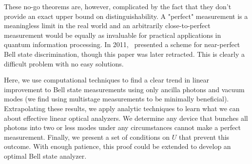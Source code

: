 \documentclass[aps,pra,twocolumn,showpacs,superscriptaddress,floatfix,10pt]{revtex4}
\begin{document}
These no-go theorems are, however, complicated by the fact that they don't provide an exact upper bound on distinguishability. A "perfect" measurement is a meaningless limit in the real world and an arbitrarily close-to-perfect measurement would be  equally as invaluable for practical applications in quantum information processing. In 2011,~\cite{Pavicic} presented a scheme for near-perfect Bell state discrimination, though this paper was later retracted. This is clearly a difficult problem with no easy solutions.

Here, we use computational techniques to find a clear trend in linear improvement to Bell state measurements using only ancilla photons and vacuum modes (we find using multistage measurements to be minimally beneficial). Extrapolating these results, we apply analytic techniques to learn what we can about effective linear optical analyzers. We determine any device that bunches all photons into two or less modes under any circumstances cannot make a perfect measurement. Finally, we present a set of conditions on $U$ that prevent this outcome. With enough patience, this proof could be extended to develop an optimal Bell state analyzer. 
\end{document}

